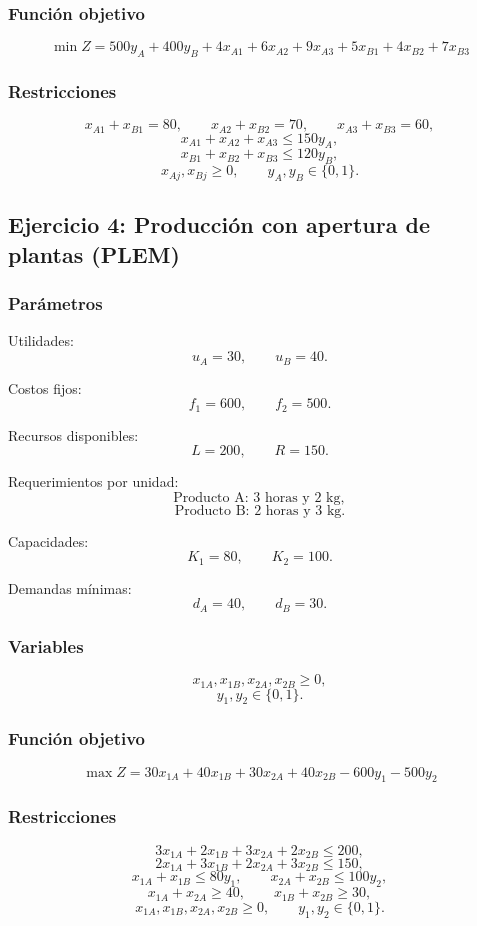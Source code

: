 \documentclass[12pt,a4paper]{article}
\begin{document}
\subsubsection*{Función objetivo}
\[
\min Z = 500y_A + 400y_B + 4x_{A1}+6x_{A2}+9x_{A3}+5x_{B1}+4x_{B2}+7x_{B3}
\]

\subsubsection*{Restricciones}
\[
x_{A1}+x_{B1}=80,\qquad x_{A2}+x_{B2}=70,\qquad x_{A3}+x_{B3}=60,
\]
\[
x_{A1}+x_{A2}+x_{A3}\le 150y_A,
\]
\[
x_{B1}+x_{B2}+x_{B3}\le 120y_B,
\]
\[
x_{Aj},x_{Bj}\ge 0,\qquad y_A,y_B\in\{0,1\}.
\]

\subsection{Ejercicio 4: Producción con apertura de plantas (PLEM)}

\subsubsection*{Parámetros}
Utilidades:
\[
u_A=30,\qquad u_B=40.
\]

Costos fijos:
\[
f_1=600,\qquad f_2=500.
\]

Recursos disponibles:
\[
L=200,\qquad R=150.
\]

Requerimientos por unidad:
\[
\text{Producto A: } 3 \text{ horas y } 2 \text{ kg},
\]
\[
\text{Producto B: } 2 \text{ horas y } 3 \text{ kg}.
\]

Capacidades:
\[
K_1=80,\qquad K_2=100.
\]

Demandas mínimas:
\[
d_A=40,\qquad d_B=30.
\]

\subsubsection*{Variables}
\[
x_{1A},x_{1B},x_{2A},x_{2B}\ge 0,
\]
\[
y_1,y_2\in\{0,1\}.
\]

\subsubsection*{Función objetivo}
\[
\max Z = 30x_{1A}+40x_{1B}+30x_{2A}+40x_{2B}-600y_1-500y_2
\]

\subsubsection*{Restricciones}
\[
3x_{1A}+2x_{1B}+3x_{2A}+2x_{2B}\le 200,
\]
\[
2x_{1A}+3x_{1B}+2x_{2A}+3x_{2B}\le 150,
\]
\[
x_{1A}+x_{1B}\le 80y_1,\qquad x_{2A}+x_{2B}\le 100y_2,
\]
\[
x_{1A}+x_{2A}\ge 40,\qquad x_{1B}+x_{2B}\ge 30,
\]
\[
x_{1A},x_{1B},x_{2A},x_{2B}\ge 0,\qquad y_1,y_2\in\{0,1\}.
\]
\end{document}
